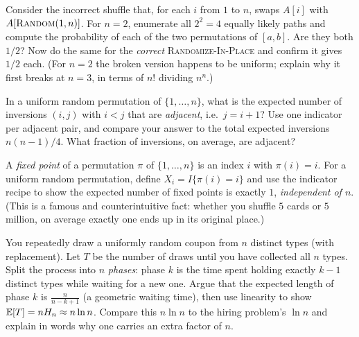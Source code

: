 \begin{exercise}
Consider the incorrect shuffle that, for each $i$ from $1$ to $n$, swaps $A[i]$
with $A[\textsc{Random}(1,n)]$. For $n = 2$, enumerate all $2^2 = 4$ equally
likely paths and compute the probability of each of the two permutations of
$[a,b]$. Are they both $1/2$? Now do the same for the \emph{correct}
\textsc{Randomize-In-Place} and confirm it gives $1/2$ each. (For $n=2$ the
broken version happens to be uniform; explain why it first breaks at $n=3$, in
terms of $n!$ dividing $n^n$.)
\end{exercise}

\begin{exercise}
In a uniform random permutation of $\{1,\dots,n\}$, what is the expected number
of inversions $(i,j)$ with $i<j$ that are \emph{adjacent}, i.e.\ $j = i+1$? Use
one indicator per adjacent pair, and compare your answer to the total expected
inversions $n(n-1)/4$. What fraction of inversions, on average, are adjacent?
\end{exercise}

\begin{exercise}
A \emph{fixed point} of a permutation $\pi$ of $\{1,\dots,n\}$ is an index $i$
with $\pi(i) = i$. For a uniform random permutation, define $X_i = I\{\pi(i) =
i\}$ and use the indicator recipe to show the expected number of fixed points is
exactly $1$, \emph{independent of $n$}. (This is a famous and counterintuitive
fact: whether you shuffle $5$ cards or $5$ million, on average exactly one ends
up in its original place.)
\end{exercise}

\begin{exercise}
You repeatedly draw a uniformly random coupon from $n$ distinct types (with
replacement). Let $T$ be the number of draws until you have collected all $n$
types. Split the process into $n$ \emph{phases}: phase $k$ is the time spent
holding exactly $k-1$ distinct types while waiting for a new one. Argue that the
expected length of phase $k$ is $\frac{n}{n-k+1}$ (a geometric waiting time), then
use linearity to show $\mathbb{E}[T] = n H_n \approx n\ln n$. Compare this $n\ln n$ to the
hiring problem's $\ln n$ and explain in words why one carries an extra factor of
$n$.
\end{exercise}

